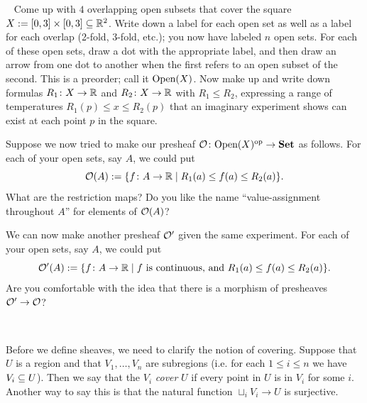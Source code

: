 \documentclass[CT4S-EN-RU]{subfiles}
\begin{document}
\begin{exerciseENG}~
\sexc Come up with $4$ overlapping open subsets that cover the square $X:=[0,3]\times[0,3]\ss\RR^2$. Write down a label for each open set as well as a label for each overlap (2-fold, 3-fold, etc.); you now have labeled $n$ open sets. For each of these open sets, draw a dot with the appropriate label, and then draw an arrow from one dot to another when the first refers to an open subset of the second. This is a preorder; call it $\Op(X)$. Now make up and write down formulas $R_1\taking X\to\RR$ and $R_2\taking X\to\RR$ with $R_1\leq R_2$, expressing a range of temperatures $R_1(p)\leq x\leq R_2(p)$ that an imaginary experiment shows can exist at each point $p$ in the square. 
\item Suppose we now tried to make our presheaf $\mcO\taking\Op(X)\op\to\Set$ as follows. For each of your open sets, say $A$, we could put $$\mcO(A):=\{f\taking A\to\RR\|R_1(a)\leq f(a)\leq R_2(a)\}.$$ What are the restriction maps? Do you like the name “value-assignment throughout $A$” for elements of $\mcO(A)$? 
\item We can now make another presheaf $\mcO'$ given the same experiment. For each of your open sets, say $A$, we could put $$\mcO'(A):=\{f\taking A\to\RR\|f\tn{ is continuous, and }R_1(a)\leq f(a)\leq R_2(a)\}.$$ Are you comfortable with the idea that there is a morphism of presheaves $\mcO'\to\mcO$?
\endsexc
\end{exerciseENG}

\begin{exerciseRUS}~
\end{exerciseRUS}

\begin{blockENG}
Before we define sheaves, we need to clarify the notion of covering. Suppose that $U$ is a region and that $V_1,\ldots,V_n$ are subregions (i.e. for each $1\leq i\leq n$ we have $V_i\ss U$). Then we say that the $V_i$ {\em cover} $U$ if every point in $U$ is in $V_i$ for some $i$. Another way to say this is that the natural function $\sqcup_iV_i\to U$ is surjective.
\end{blockENG}

\begin{blockRUS}
\end{blockRUS}
\end{document}
